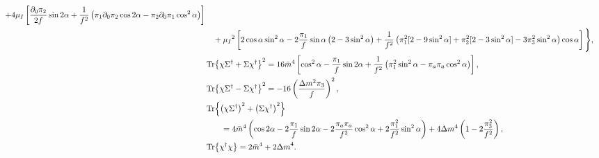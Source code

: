 \begin{align}
        + 4 \mu_I 
        \left[
            \frac{\partial_0 \pi_2}{2 f} \sin{2\alpha}
            + \frac{1}{f^2}
            \left(
                \pi_1 \partial_0 \pi_2 \cos{2\alpha}
                - \pi_2 \partial_0 \pi_1\cos^2{\alpha}
            \right)
        \right]\\\notag
        & \quad + \mu_I{}^2
        \left[
            2\cos{\alpha}\sin^2{\alpha} 
            - 2 \frac{\pi_1}{f} \sin{\alpha}
            \left(2 - 3\sin^2{\alpha}\right)
            + \frac{1}{f^2}
            \left(                
                \pi_1^2[2 - 9 \sin^2{\alpha}]
                + \pi_2^2 [2 - 3 \sin^2{\alpha}]
                - 3\pi_3^2\sin^2{\alpha}
            \right)
            \cos{\alpha}
        \right]
    \Bigg\}, \\
    \label{l3}
    & \Tr{\chi \Sigma^\dagger + \Sigma \chi^\dagger }^2
    = 16 \bar m^4
    \left[
        \cos^2{\alpha} 
        - \frac{\pi_1}{f} \sin{2\alpha}
        + \frac{1}{f^2}\left(\pi_1^2 \sin^2{\alpha} - \pi_a \pi_a \cos^2{\alpha}\right)
    \right], \\
    \label{l7}
    & \Tr{\chi \Sigma^\dagger - \Sigma \chi^\dagger }^2
     = - 16 \left( \frac{\Delta m^2 \pi_3}{f} \right)^2, \\
    \notag
    & \Tr{\left(\chi \Sigma^\dagger\right)^2 + \left(\Sigma \chi^\dagger \right)^2}
    \\\label{h3}
    & \quad \quad = 4 \bar m^4
    \left(
        \cos{2\alpha} 
        - 2\frac{\pi_1}{f} \sin{2\alpha}
        - 2\frac{\pi_a \pi_a}{f^2} \cos^2{\alpha}
        + 2\frac{\pi_1^2}{f^2} \sin^2{\alpha}
    \right)
    + 4 \Delta m^4
    \left(
        1- 2\frac{ \pi_3^2}{f^2}
    \right)
    , \\
    \label{h2}
    & \Tr{\chi^\dagger \chi} = 2 {\bar m}^4 + 2{\Delta m}^4.
\end{align}

\endgroup

